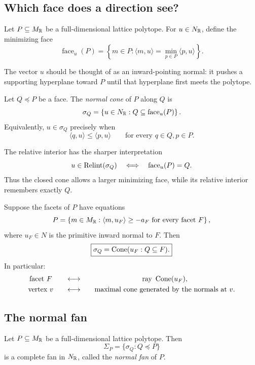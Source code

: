\subsection{Which face does a direction see?}

Let \(P\subseteq M_{\mathbb{R}}\) be a full-dimensional lattice polytope. For
\(u\in N_{\mathbb{R}}\), define the minimizing face
\[
\operatorname{face}_u(P)
=
\left\{
 m\in P:
 \langle m,u\rangle
 =
 \min_{p\in P}\langle p,u\rangle
\right\}.
\]

The vector \(u\) should be thought of as an inward-pointing normal:
it pushes a supporting hyperplane toward \(P\) until that hyperplane
first meets the polytope.

\begin{definition}
\label{def:normal-cone-face}
Let \(Q\preceq P\) be a face. The \emph{normal cone} of \(P\) along
\(Q\) is
\[
\sigma_Q
=
\left\{
 u\in N_{\mathbb{R}}:
 Q\subseteq\operatorname{face}_u(P)
\right\}.
\]
Equivalently, \(u\in\sigma_Q\) precisely when
\[
\langle q,u\rangle
\leq
\langle p,u\rangle
\qquad
\text{for every }q\in Q,
p\in P.
\]
\end{definition}

The relative interior has the sharper interpretation
\[
u\in\operatorname{Relint}(\sigma_Q)
\quad\Longleftrightarrow\quad
\operatorname{face}_u(P)=Q.
\]
Thus the closed cone allows a larger minimizing face, while its
relative interior remembers exactly \(Q\).

Suppose the facets of \(P\) have equations
\[
P
=
\left\{
 m\in M_{\mathbb{R}}:
 \langle m,u_F\rangle\geq-a_F
 \text{ for every facet }F
\right\},
\]
where \(u_F\in N\) is the primitive inward normal to \(F\). Then
\[
\boxed{
\sigma_Q
=
\operatorname{Cone}(u_F:Q\subseteq F).
}
\]
In particular:
\[
\begin{array}{c@{\qquad\longleftrightarrow\qquad}c}
\text{facet }F
&
\text{ray }\Cone{u_F},
\\[1mm]
\text{vertex }v
&
\text{maximal cone generated by the normals at }v.
\end{array}
\]

\subsection{The normal fan}

\begin{theorem}
\label{thm:normal-fan-polytope}
Let \(P\subseteq M_{\mathbb{R}}\) be a full-dimensional lattice polytope. Then
\[
\Sigma_P
=
\{\sigma_Q:Q\preceq P\}
\]
is a complete fan in \(N_{\mathbb{R}}\), called the \emph{normal fan} of
\(P\).
\end{theorem}

